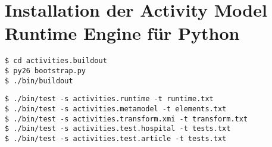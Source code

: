 \chapter{Installation der Activity Model Runtime Engine für Python}\label{amrep-installation}



\begin{lstlisting}
$ cd activities.buildout
$ py26 bootstrap.py
$ ./bin/buildout
\end{lstlisting}

\begin{lstlisting}
$ ./bin/test -s activities.runtime -t runtime.txt
$ ./bin/test -s activities.metamodel -t elements.txt
$ ./bin/test -s activities.transform.xmi -t transform.txt
$ ./bin/test -s activities.test.hospital -t tests.txt
$ ./bin/test -s activities.test.article -t tests.txt
\end{lstlisting}













